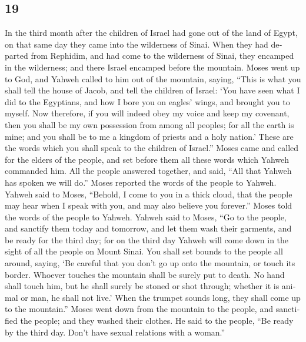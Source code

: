 \begin{paracol}{2}
\begin{otherlanguage}{english}
\hypertarget{section-37}{%
\section{19}\label{section-37}}

 In the third month after the children of Israel had gone
out of the land of Egypt, on that same day they came into the wilderness
of Sinai.  When they had departed from Rephidim, and had
come to the wilderness of Sinai, they encamped in the wilderness; and
there Israel encamped before the mountain.  Moses went up
to God, and Yahweh called to him out of the mountain, saying, ``This is
what you shall tell the house of Jacob, and tell the children of Israel:
 `You have seen what I did to the Egyptians, and how I
bore you on eagles' wings, and brought you to myself.  Now
therefore, if you will indeed obey my voice and keep my covenant, then
you shall be my own possession from among all peoples; for all the earth
is mine;  and you shall be to me a kingdom of priests and
a holy nation.' These are the words which you shall speak to the
children of Israel.''  Moses came and called for the
elders of the people, and set before them all these words which Yahweh
commanded him.  All the people answered together, and
said, ``All that Yahweh has spoken we will do.'' Moses reported the
words of the people to Yahweh.  Yahweh said to Moses,
``Behold, I come to you in a thick cloud, that the people may hear when
I speak with you, and may also believe you forever.'' Moses told the
words of the people to Yahweh.  Yahweh said to Moses,
``Go to the people, and sanctify them today and tomorrow, and let them
wash their garments,  and be ready for the third day; for
on the third day Yahweh will come down in the sight of all the people on
Mount Sinai.  You shall set bounds to the people all
around, saying, `Be careful that you don't go up onto the mountain, or
touch its border. Whoever touches the mountain shall be surely put to
death.  No hand shall touch him, but he shall surely be
stoned or shot through; whether it is animal or man, he shall not live.'
When the trumpet sounds long, they shall come up to the mountain.''
 Moses went down from the mountain to the people, and
sanctified the people; and they washed their clothes.  He
said to the people, ``Be ready by the third day. Don't have sexual
relations with a woman.''


\end{otherlanguage}
\end{paracol}
